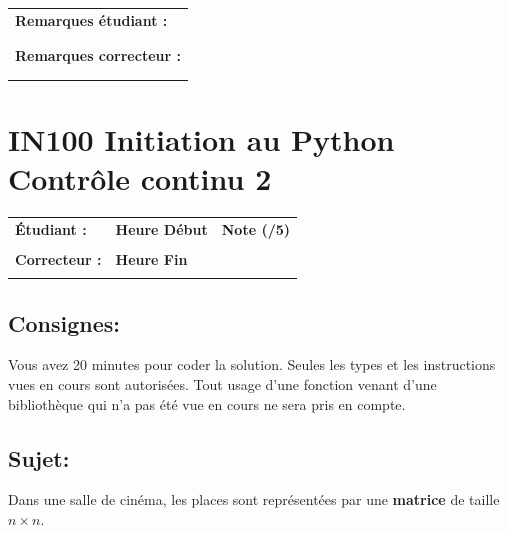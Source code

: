 \documentclass[a4paper,11pt]{article}
\begin{document}
\begin{table}[h!]
\centering
\renewcommand{\arraystretch}{1.4} %
\begin{tabular}{|p{15cm}|}
\hline
\textbf{Remarques étudiant :}    \\
 \\
 \\
\hline
\textbf{Remarques correcteur :}  \\
 \\
 \\
\hline
\end{tabular}
\end{table}

\newpage

\section*{\center IN100 Initiation au Python\\
Contrôle continu 2}


\begin{table}[h!]
\centering
\renewcommand{\arraystretch}{1.4} %
\begin{tabular}{|p{10cm}|p{3cm}|p{2cm}|}
\hline
\textbf{Étudiant :} & \textbf{Heure Début }  & \textbf{Note (/5) }  \\
& & \\
\hline
\textbf{Correcteur :} & \textbf{Heure Fin } & \\
& & \\
\hline

\hline
\end{tabular}
\end{table}
\vspace{-0.6 cm}
\subsection*{Consignes:} Vous avez 20 minutes pour coder la solution. Seules les types et les instructions vues en cours sont autorisées. Tout usage d'une fonction 
venant d'une bibliothèque qui n'a pas été vue en cours ne sera pris en compte. 

\subsection*{Sujet:}

Dans une salle de cinéma, les places sont représentées par une \textbf{matrice} de taille $n \times n$.  
\end{document}
